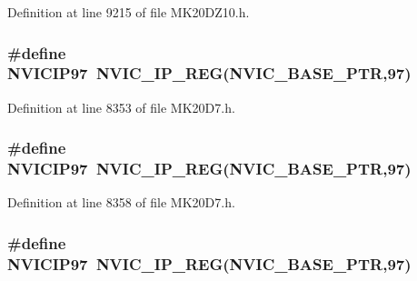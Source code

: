 Definition at line 9215 of file M\+K20\+D\+Z10.\+h.

\subsubsection[{\texorpdfstring{N\+V\+I\+C\+I\+P97}{NVICIP97}}]{\setlength{\rightskip}{0pt plus 5cm}\#define N\+V\+I\+C\+I\+P97~{\bf N\+V\+I\+C\+\_\+\+I\+P\+\_\+\+R\+EG}({\bf N\+V\+I\+C\+\_\+\+B\+A\+S\+E\+\_\+\+P\+TR},97)}\hypertarget{group___n_v_i_c___register___accessor___macros_ga39263d8981cb8cbfee1d543358157a48}{}\label{group___n_v_i_c___register___accessor___macros_ga39263d8981cb8cbfee1d543358157a48}


Definition at line 8353 of file M\+K20\+D7.\+h.

\subsubsection[{\texorpdfstring{N\+V\+I\+C\+I\+P97}{NVICIP97}}]{\setlength{\rightskip}{0pt plus 5cm}\#define N\+V\+I\+C\+I\+P97~{\bf N\+V\+I\+C\+\_\+\+I\+P\+\_\+\+R\+EG}({\bf N\+V\+I\+C\+\_\+\+B\+A\+S\+E\+\_\+\+P\+TR},97)}\hypertarget{group___n_v_i_c___register___accessor___macros_ga39263d8981cb8cbfee1d543358157a48}{}\label{group___n_v_i_c___register___accessor___macros_ga39263d8981cb8cbfee1d543358157a48}


Definition at line 8358 of file M\+K20\+D7.\+h.

\subsubsection[{\texorpdfstring{N\+V\+I\+C\+I\+P97}{NVICIP97}}]{\setlength{\rightskip}{0pt plus 5cm}\#define N\+V\+I\+C\+I\+P97~{\bf N\+V\+I\+C\+\_\+\+I\+P\+\_\+\+R\+EG}({\bf N\+V\+I\+C\+\_\+\+B\+A\+S\+E\+\_\+\+P\+TR},97)}\hypertarget{group___n_v_i_c___register___accessor___macros_ga39263d8981cb8cbfee1d543358157a48}{}\label{group___n_v_i_c___register___accessor___macros_ga39263d8981cb8cbfee1d543358157a48}


